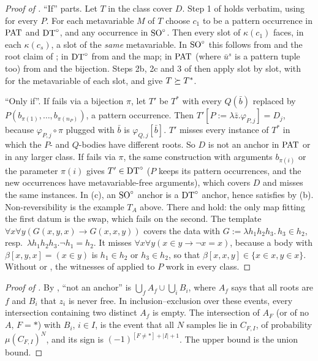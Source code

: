 \begin{proof}[Proof of ]
``If'' parts. Let $T$ in the class cover $D$. Step 1 of  holds verbatim, using  for every
$P$. For each metavariable $M$ of $T$ choose $c_1$ to be a pattern occurrence in $\mathrm{PAT}$ and $\mathrm{DT}^{\circ}$, and any occurrence in
$\mathrm{SO}^{\circ}$. Then every slot of $\kappa(c_1)$ faces, in each $\kappa(c_s)$, a slot of the \emph{same} metavariable. In $\mathrm{SO}^{\circ}$
this follows from \zfDroot{} and the root claim of ; in $\mathrm{DT}^{\circ}$ from \zfDdt{} and the map; in $\mathrm{PAT}$
(where $\bar u^s$ is a pattern tuple too) from \zfDpat{} and the bijection. Steps 2b, 2c and 3 of
 then apply slot by slot, with  for the metavariable of each slot, and give $T\succeq T^*$.

``Only if''. If  fails via a bijection $\pi$, let $T'$ be $T^*$ with every $Q(\bar b)$ replaced by
$P(b_{\pi(1)},\dots,b_{\pi(n_P)})$, a pattern occurrence. Then $T'[P:=\lambda\bar z.\varphi_{P,j}]=D_j$, because
$\varphi_{P,j}\circ\pi$ plugged with $\bar b$ is $\varphi_{Q,j}[\bar b]$. $T'$ misses every instance of $T^*$ in which
the $P$- and $Q$-bodies have different roots. So $D$ is not an anchor in $\mathrm{PAT}$ or in any larger class. If
 fails via $\pi$, the same construction with arguments $b_{\pi(i)}$ or the parameter $\pi(i)$ gives
$T'\in\mathrm{DT}^{\circ}$ ($P$ keeps its pattern occurrences, and the new occurrences have metavariable-free arguments), which covers $D$
and misses the same instances. In (c), an $\mathrm{SO}^{\circ}$ anchor is a $\mathrm{DT}^{\circ}$ anchor, hence satisfies \zfDdt{} by (b).
Non-reversibility is the example $T_A$ above. There \zfDpat{} and \zfDdt{} hold: the only map fitting
the first datum is the swap, which fails on the second. The template $\forall x\forall y(G(x,y,x)\to G(x,x,y))$ covers
the data with $G:=\lambda h_1h_2h_3.\,h_3\in h_2$, resp.\ $\lambda h_1h_2h_3.\neg h_1=h_2$. It misses $\forall x\forall
y(x\in y\to\neg x=x)$, because a body with $\beta[x,y,x]=(x\in y)$ is $h_1\in h_2$ or $h_3\in h_2$, so that
$\beta[x,x,y]\in\{x\in x,y\in x\}$. Without  or , the witnesses of  applied to $P$
work in every class.
\end{proof}

\begin{proof}[Proof of ]
By , ``not an anchor'' is $\bigcup_fA_f\cup\bigcup_iB_i$, where $A_f$ says that all roots are $f$
and $B_i$ that $z_i$ is never free. In inclusion--exclusion over these events, every intersection containing two
distinct $A_f$ is empty. The intersection of $A_F$ (or of no $A$, $F={*}$) with $B_i$, $i\in I$, is the event that all
$N$ samples lie in $C_{F,I}$, of probability $\mu(C_{F,I})^N$, and its sign is $(-1)^{[F\ne{*}]+|I|+1}$. The upper
bound is the union bound.
\end{proof}

